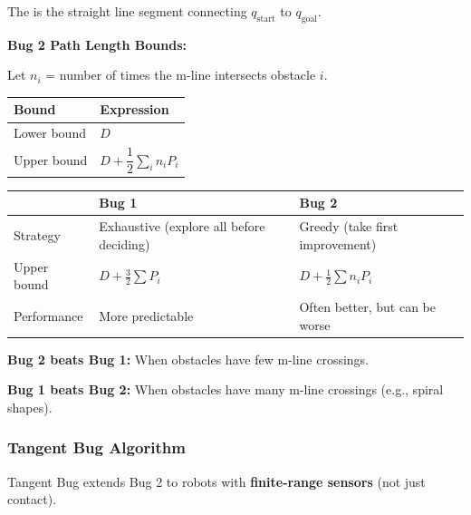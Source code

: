 \begin{defbox}[M-Line]
The  is the straight line segment connecting $q_{\text{start}}$ to $q_{\text{goal}}$.
\end{defbox}

\textbf{Bug 2 Path Length Bounds:}

Let $n_i$ = number of times the m-line intersects obstacle $i$.

\begin{center}
\renewcommand{\arraystretch}{1.3}
\begin{tabular}{@{} l l @{}}
\toprule
\textbf{Bound} & \textbf{Expression} \\
\midrule
Lower bound & $D$ \\
Upper bound & $D + \dfrac{1}{2} \sum_i n_i P_i$ \\
\bottomrule
\end{tabular}
\end{center}

\begin{tipbox}
\begin{center}
\renewcommand{\arraystretch}{1.3}
\begin{tabular}{@{} l p{5.5cm} p{5.5cm} @{}}
\toprule
& \textbf{Bug 1} & \textbf{Bug 2} \\
\midrule
Strategy & Exhaustive (explore all before deciding) & Greedy (take first improvement) \\
Upper bound & $D + \frac{3}{2}\sum P_i$ & $D + \frac{1}{2}\sum n_i P_i$ \\
Performance & More predictable & Often better, but can be worse \\
\bottomrule
\end{tabular}
\end{center}

\textbf{Bug 2 beats Bug 1:} When obstacles have few m-line crossings.

\textbf{Bug 1 beats Bug 2:} When obstacles have many m-line crossings (e.g., spiral shapes).
\end{tipbox}

\separator

\subsubsection{Tangent Bug Algorithm}

Tangent Bug extends Bug 2 to robots with \textbf{finite-range sensors} (not just contact).

